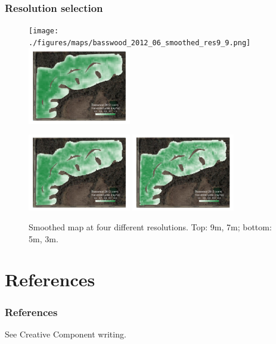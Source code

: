 \documentclass{beamer}
\begin{document}
\begin{frame}
  \frametitle{Resolution selection}
  
  \begin{figure}
    \texttt{[image: ./figures/maps/basswood\_2012\_06\_smoothed\_res9\_9.png]}
    \includegraphics[width=0.4\textwidth]{./figures/maps/basswood_2012_06_smoothed_res7_7.png}

    \vspace{0px}
    
    \includegraphics[width=0.4\textwidth]{./figures/maps/basswood_2012_06_smoothed_res5_5.png}
    \includegraphics[width=0.4\textwidth]{./figures/maps/basswood_2012_06_smoothed_res3_3.png}

    \caption{Smoothed map at four different resolutions. Top: 9m, 7m;
      bottom: 5m, 3m.}

  \end{figure}
  
  
\end{frame}


\section*{References}

\begin{frame}[allowframebreaks]
  \frametitle{References}

  See Creative Component writing.


\end{frame}
\end{document}
